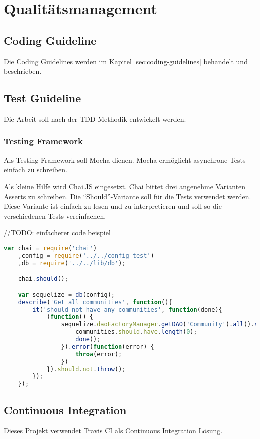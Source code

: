 \chapter{Qualitätsmanagement}


\section{Coding Guideline}
Die Coding Guidelines werden im Kapitel \ref{sec:coding-guidelines}  behandelt und beschrieben.


\section{Test Guideline}
Die Arbeit soll nach der \gls{TDD}-Methodik entwickelt werden.

\subsection*{Testing Framework}
Als Testing Framework soll Mocha \cite{Mocha} dienen. Mocha ermöglicht asynchrone Tests einfach zu schreiben.
\newline

Als kleine Hilfe wird Chai.JS \cite{ChaiJS} eingesetzt. Chai bittet drei angenehme Varianten Asserts zu schreiben. Die ``Should''-Variante soll für die Tests verwendet werden. Diese Variante ist einfach zu lesen und zu interpretieren und soll so die verschiedenen Tests vereinfachen. \newline

//TODO: einfacherer code beispiel
\begin{lstlisting}[language=JavaScript, caption=Chai.js Should Beispiel]
var chai = require('chai')
	,config = require('../../config_test')
	,db = require('../../lib/db');

	chai.should();

	var sequelize = db(config);
	describe('Get all communities', function(){
		it('should not have any communities', function(done){
			(function() {
				sequelize.daoFactoryManager.getDAO('Community').all().success(function(communities) {
					communities.should.have.length(0);
					done();
				}).error(function(error) {
					throw(error);
				})
			}).should.not.throw();
		});
	});
\end{lstlisting}


\section{Continuous Integration}
Dieses Projekt verwendet Travis CI als Continuous Integration Lösung.

